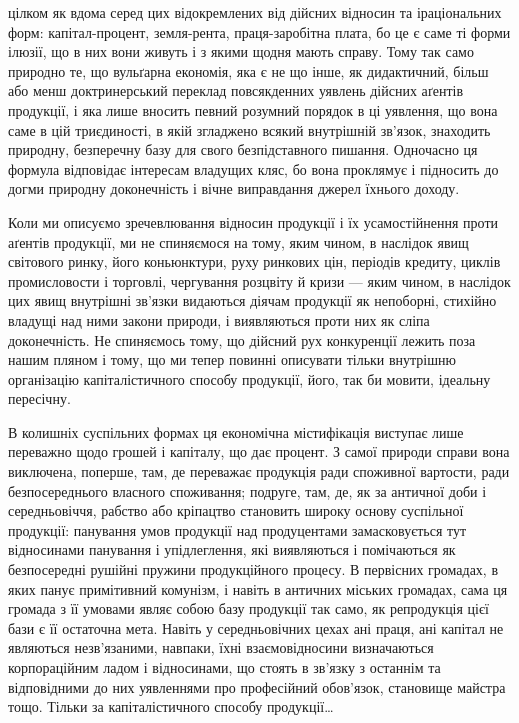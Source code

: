 \parcont{}  %
цілком як вдома серед цих відокремлених від дійсних відносин та іраціональних
форм: капітал-процент, земля-рента, праця-заробітна плата, бо це є саме ті
форми ілюзії, що в них вони живуть і з якими щодня мають справу. Тому
так само природно те, що вульґарна економія, яка є не що інше, як дидактичний,
більш або менш доктринерський переклад повсякденних уявлень дійсних аґентів
продукції, і яка лише вносить певний розумний порядок в ці уявлення, що вона
саме в цій триєдиності, в якій згладжено всякий внутрішній зв’язок, знаходить
природну, безперечну базу для свого безпідставного пишання. Одночасно ця
формула відповідає інтересам владущих кляс, бо вона проклямує і підносить
до догми природну доконечність і вічне виправдання джерел їхнього доходу.

Коли ми описуємо зречевлювання відносин продукції і їх усамостійнення
проти аґентів продукції, ми не спиняємося на тому, яким чином, в наслідок
явищ світового ринку, його коньюнктури, руху ринкових цін, періодів кредиту,
циклів промисловости і торговлі, чергування розцвіту й кризи — яким чином,
в наслідок цих явищ внутрішні зв’язки видаються діячам продукції як непоборні,
стихійно владущі над ними закони природи, і виявляються проти них як сліпа
доконечність. Не спиняємось тому, що дійсний рух конкуренції лежить поза
нашим пляном і тому, що ми тепер повинні описувати тільки внутрішню
організацію капіталістичного способу продукції, його, так би мовити, ідеальну
пересічну.

В колишніх суспільних формах ця економічна містифікація виступає лише
переважно щодо грошей і капіталу, що дає процент. З самої природи справи
вона виключена, поперше, там, де переважає продукція ради споживної вартости,
ради безпосереднього власного споживання; подруге, там, де, як за античної доби
і середньовіччя, рабство або кріпацтво становить широку основу суспільної продукції:
панування умов продукції над продуцентами замасковується тут відносинами
панування і упідлеглення, які виявляються і помічаються як безпосередні
рушійні пружини продукційного процесу. В первісних громадах, в яких
панує примітивний комунізм, і навіть в античних міських громадах, сама ця
громада з її умовами являє собою базу продукції так само, як репродукція цієї
бази є її остаточна мета. Навіть у середньовічних цехах ані праця, ані капітал
не являються незв’язаними, навпаки, їхні взаємовідносини визначаються корпораційним
ладом і відносинами, що стоять в зв’язку з останнім та відповідними
до них уявленнями про професійний обов’язок, становище майстра тощо.
Тільки за капіталістичного способу продукції\dots{}

